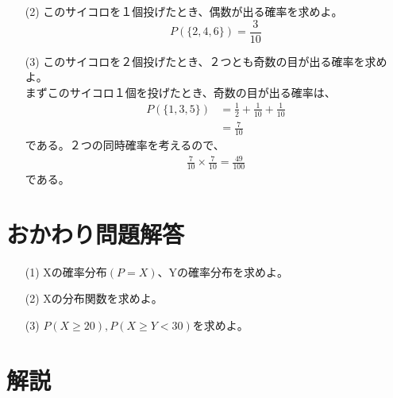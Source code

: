 \documentclass[a4j,uplatex]{jsarticle}
\begin{document}
\begin{itemize}
  \item[(2)] このサイコロを１個投げたとき、偶数が出る確率を求めよ。
  \begin{equation}
    P(\{2,4,6\})=\frac{3}{10}
  \end{equation} 
  \item[(3)] このサイコロを２個投げたとき、２つとも奇数の目が出る確率を求めよ。
    \\
    まずこのサイコロ１個を投げたとき、奇数の目が出る確率は、
  \begin{equation}
    \begin{split}
      P(\{1,3,5\})&=\frac{1}{2} + \frac{1}{10} + \frac{1}{10}\\
      &=\frac{7}{10}
    \end{split}
  \end{equation}  
  である。２つの同時確率を考えるので、
  \begin{equation}
    \begin{split}
      \frac{7}{10}\times \frac{7}{10} = \frac{49}{100}
    \end{split}
  \end{equation}  
  である。
\end{itemize}

\section*{おかわり問題解答}
\begin{itemize}
  \item[(1)] Xの確率分布$(P=X)$、Yの確率分布を求めよ。
  \item[(2)] Xの分布関数を求めよ。 
  \item[(3)] $ P(X\ge20) , P(X\ge Y<30) $を求めよ。 
\end{itemize}

\section*{解説}
\end{document}
